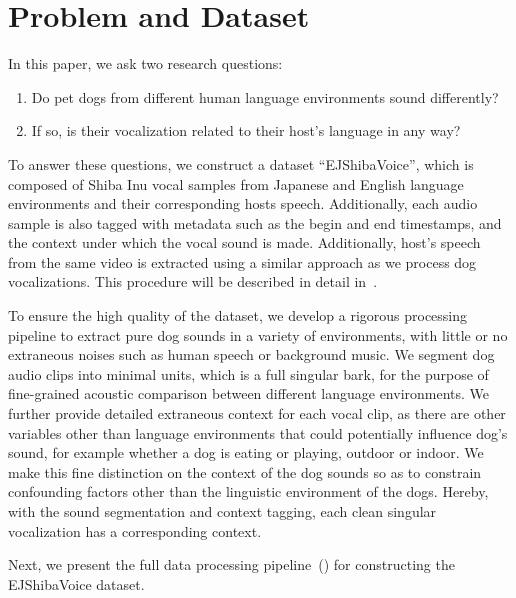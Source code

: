 \section{Problem and Dataset}
\label{sec:assumption}
In this paper, we ask two research questions: 
\begin{enumerate}
\item Do pet dogs from different human language environments sound differently? 
\item If so, is their vocalization related to their host's language in any way? 
\end{enumerate}

To answer these questions, we construct a dataset ``EJShibaVoice'', 
which is composed of Shiba Inu vocal samples from Japanese and English language environments 
and their corresponding hosts speech. Additionally, each audio sample is also tagged with
metadata such as the begin and end timestamps, and the context under which the vocal sound is made.    
Additionally, host's speech from the same video is extracted using a similar approach as we process dog vocalizations. This procedure will be described in detail in~.

To ensure the high quality of the dataset, we develop a rigorous processing pipeline to extract pure dog sounds in a variety of environments, with little or no extraneous noises such as human speech or background music. We segment dog audio clips into minimal units, which is a full singular bark, for the purpose of fine-grained acoustic comparison between different language environments. 
We further provide detailed extraneous context for each vocal clip, as there are other variables other than language environments that could potentially influence dog's  sound, for example whether a dog is eating or playing, outdoor or indoor\cite{larranaga2015comparing, molnar2008classification}. We make this fine distinction on the context of the dog sounds so as to constrain confounding factors other than the linguistic environment of the dogs. Hereby, with the sound segmentation and context tagging, each clean singular vocalization has a corresponding context.


Next, we present the full data processing pipeline~() 
for constructing the EJShibaVoice dataset. 

